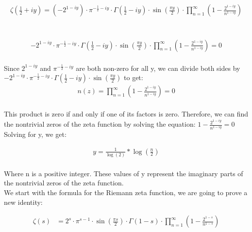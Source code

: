 \documentclass{article}
\begin{document}
\begin{align*}
\zeta\left(\frac{1}{2}+iy\right) = (-2^{1-iy}) \cdot \pi^{-\frac{1}{2}-iy}\cdot \Gamma\left(\frac{1}{2}-iy\right) \cdot \sin\left(\frac{\pi y}{2}\right) \cdot \prod_{n=1}^{\infty}\left(1-\frac{2^{1-iy}}{n^{1-iy}}\right)\\
\end{align*}

 \\

\begin{align*}
-2^{1-iy}\cdot \pi^{-\frac{1}{2}-iy}\cdot \Gamma\left(\frac{1}{2}-iy\right) \cdot \sin\left(\frac{\pi y}{2}\right) \cdot \prod_{n=1}^{\infty}\left(1-\frac{2^{1-iy}}{n^{1-iy}}\right) = 0\\
\end{align*}

Since $2^{1-iy}$ and $\pi^{-\frac{1}{2}-iy}$ are both non-zero for all y, we can divide both sides by  $-2^{1-iy}\cdot \pi^{-\frac{1}{2}-iy}\cdot \Gamma\left(\frac{1}{2}-iy\right) \cdot \sin\left(\frac{\pi y}{2}\right)$ to get: \\

\begin{align*}
n(z)=\prod_{n=1}^{\infty}\left(1-\frac{2^{1-iy}}{n^{1-iy}}\right) = 0 \\
\end{align*}

This product is zero if and only if one of its factors is zero. Therefore, we can find the nontrivial zeros of the zeta function by solving the equation: $1-\frac{2^{1-iy}}{n^{1-iy}} = 0$ Solving for y, we get:

\begin{align*}
y = \frac{1}{\log(2)} * \log\left(\frac{n}{2}\right) \\
\end{align*}

Where n is a positive integer. These values of y represent the imaginary parts of the nontrivial zeros of the zeta function. \\

We start with the formula for the Riemann zeta function, we are going to prove a new identity:

\begin{align*}
\zeta(s) &= 2^{s}\cdot\pi^{s-1}\cdot\sin(\frac{\pi s}{2})\cdot\Gamma(1-s)\cdot\prod_{n=1}^{\infty}(1-\frac{2^{1-s}}{n^{1-s}}) \\
\end{align*}
\end{document}
